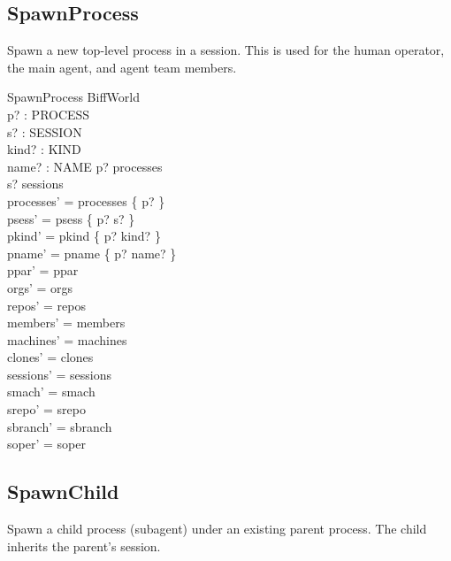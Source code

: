 \documentclass[a4paper,10pt,fleqn]{article}
\begin{document}
\subsection{SpawnProcess}

Spawn a new top-level process in a session.  This is used for the human
operator, the main agent, and agent team members.

\begin{schema}{SpawnProcess}
  \Delta BiffWorld \\
  p? : PROCESS \\
  s? : SESSION \\
  kind? : KIND \\
  name? : NAME
  \where
  p? \notin processes \\
  s? \in sessions \\
  processes' = processes \cup \{ p? \} \\
  psess' = psess \cup \{ p? \mapsto s? \} \\
  pkind' = pkind \cup \{ p? \mapsto kind? \} \\
  pname' = pname \cup \{ p? \mapsto name? \} \\
  ppar' = ppar \\
  orgs' = orgs \\
  repos' = repos \\
  members' = members \\
  machines' = machines \\
  clones' = clones \\
  sessions' = sessions \\
  smach' = smach \\
  srepo' = srepo \\
  sbranch' = sbranch \\
  soper' = soper
\end{schema}

\subsection{SpawnChild}

Spawn a child process (subagent) under an existing parent process.  The
child inherits the parent's session.
\end{document}
